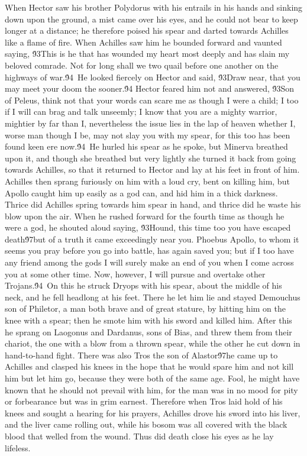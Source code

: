{When Hector saw his brother Polydorus with his entrails in his hands and sinking down upon the ground, a mist came over his eyes, and he could not bear to keep longer at a distance; he therefore poised his spear and darted towards Achilles like a flame of fire. When Achilles saw him he bounded forward and vaunted saying, \'93This is he that has wounded my heart most deeply and has slain my beloved comrade. Not for long shall we two quail before one another on the highways of war.\'94\
He looked fiercely on Hector and said, \'93Draw near, that you may meet your doom the sooner.\'94 Hector feared him not and answered, \'93Son of Peleus, think not that your words can scare me as though I were a child; I too if I will can brag and talk unseemly; I know that you are a mighty warrior, mightier by far than I, nevertheless the issue lies in the lap of heaven whether I, worse man though I be, may not slay you with my spear, for this too has been found keen ere now.\'94\
He hurled his spear as he spoke, but Minerva breathed upon it, and though she breathed but very lightly she turned it back from going towards Achilles, so that it returned to Hector and lay at his feet in front of him. Achilles then sprang furiously on him with a loud cry, bent on killing him, but Apollo caught him up easily as a god can, and hid him in a thick darkness. Thrice did Achilles spring towards him spear in hand, and thrice did he waste his blow upon the air. When he rushed forward for the fourth time as though he were a god, he shouted aloud saying, \'93Hound, this time too you have escaped death\'97but of a truth it came exceedingly near you. Phoebus Apollo, to whom it seems you pray before you go into battle, has again saved you; but if I too have any friend among the gods I will surely make an end of you when I come across you at some other time. Now, however, I will pursue and overtake other Trojans.\'94\
On this he struck Dryops with his spear, about the middle of his neck, and he fell headlong at his feet. There he let him lie and stayed Demouchus son of Philetor, a man both brave and of great stature, by hitting him on the knee with a spear; then he smote him with his sword and killed him. After this he sprang on Laogonus and Dardanus, sons of Bias, and threw them from their chariot, the one with a blow from a thrown spear, while the other he cut down in hand-to-hand fight. There was also Tros the son of Alastor\'97he came up to Achilles and clasped his knees in the hope that he would spare him and not kill him but let him go, because they were both of the same age. Fool, he might have known that he should not prevail with him, for the man was in no mood for pity or forbearance but was in grim earnest. Therefore when Tros laid hold of his knees and sought a hearing for his prayers, Achilles drove his sword into his liver, and the liver came rolling out, while his bosom was all covered with the black blood that welled from the wound. Thus did death close his eyes as he lay lifeless.\
}
